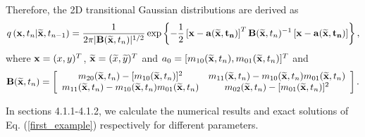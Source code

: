 \documentclass[a4paper, 11pt, final]{article}
\begin{document}
Therefore, the 2D transitional Gaussian distributions are derived
as
\begin{equation}\label{TG2}
q\left({\bf x},t_n|{\bf
\widetilde{x}},t_{n-1}\right)=\frac{1}{2\pi|{\bf B}({\bf
\widetilde{x}},t_n)|^{1/2}}\exp\left\{-\frac{1}{2}\left[\bf
x-a({\bf \widetilde{x}},t_n)\right]^T{\bf B}({\bf
\widetilde{x}},t_n)^{-1}\left[\bf x-a({\bf
\widetilde{x}},t_n)\right]\right\},
\end{equation}
where ${\bf x}=(x,y)^T$, ${\bf
\widetilde{x}}=(\widetilde{x},\widetilde{y})^T$ and
$a_0=[m_{10}({\bf \widetilde{x}},t_n),m_{01}({\bf
\widetilde{x}},t_n)]^T$ and
\begin{displaymath}
{\bf B}({\bf \widetilde{x}},t_n)=\left[
\begin{array}{cc}
m_{20}({\bf \widetilde{x}},t_n)-[m_{10}({\bf \widetilde{x}},t_n)]^2 & m_{11}({\bf \widetilde{x}},t_n)-m_{10}({\bf \widetilde{x}},t_n)m_{01}({\bf \widetilde{x}},t_n)\\
m_{11}({\bf \widetilde{x}},t_n)-m_{10}({\bf \widetilde{x}},t_n)m_{01}({\bf \widetilde{x}},t_n) & m_{02}({\bf \widetilde{x}},t_n)-[m_{01}({\bf \widetilde{x}},t_n)]^2\\
\end{array}\right].
\end{displaymath}

In sections 4.1.1-4.1.2, we calculate the numerical results
and exact solutions of Eq. (\ref{first_example}) respectively for different 
parameters.
\end{document}
